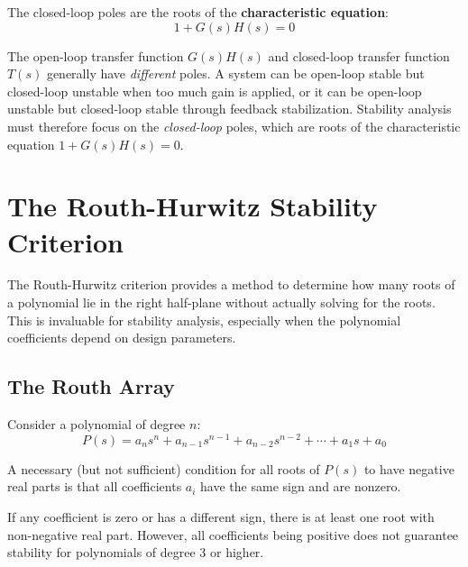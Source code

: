 The closed-loop poles are the roots of the \textbf{characteristic equation}:
\begin{equation}
1 + G(s)H(s) = 0
\label{eq:characteristic}
\end{equation}

\begin{conceptbox}
The open-loop transfer function $G(s)H(s)$ and closed-loop transfer function $T(s)$ generally have \emph{different} poles. A system can be open-loop stable but closed-loop unstable when too much gain is applied, or it can be open-loop unstable but closed-loop stable through feedback stabilization. Stability analysis must therefore focus on the \emph{closed-loop} poles, which are roots of the characteristic equation $1 + G(s)H(s) = 0$.
\end{conceptbox}

\section{The Routh-Hurwitz Stability Criterion}
\label{sec:routh_hurwitz}

The Routh-Hurwitz criterion provides a method to determine how many roots of a polynomial lie in the right half-plane without actually solving for the roots. This is invaluable for stability analysis, especially when the polynomial coefficients depend on design parameters.

\subsection{The Routh Array}

Consider a polynomial of degree $n$:
\begin{equation}
P(s) = a_n s^n + a_{n-1} s^{n-1} + a_{n-2} s^{n-2} + \cdots + a_1 s + a_0
\label{eq:characteristic_poly}
\end{equation}

\begin{theorem}
\label{thm:necessary}
A necessary (but not sufficient) condition for all roots of $P(s)$ to have negative real parts is that all coefficients $a_i$ have the same sign and are nonzero.
\end{theorem}

If any coefficient is zero or has a different sign, there is at least one root with non-negative real part. However, all coefficients being positive does not guarantee stability for polynomials of degree 3 or higher.

